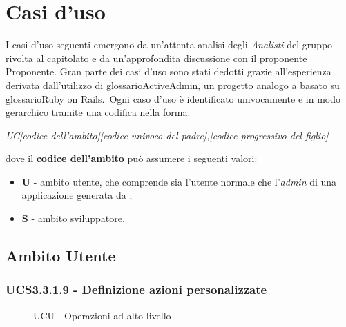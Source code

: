 \section{Casi d'uso}
I casi d'uso seguenti emergono da un'attenta analisi degli \textit{Analisti} del gruppo \GroupName{} rivolta al capitolato e da un'approfondita discussione con il proponente Proponente{}. Gran parte dei casi d'uso sono stati dedotti grazie all'esperienza derivata dall'utilizzo di glossario{ActiveAdmin}, un progetto analogo a \ProjectName{} basato su glossario{Ruby on Rails}.\
Ogni caso d'uso è identificato univocamente e in modo gerarchico tramite una codifica nella forma:

\begin{center}

\textit{UC[codice dell'ambito][codice univoco del padre],[codice progressivo del figlio]}

\end{center} 

dove il \textbf{codice dell'ambito} può assumere i seguenti valori:

\begin{itemize}

  \item \textbf{U} - ambito utente, che comprende sia l'utente normale che l'\textit{admin} di una applicazione generata da \ProjectName{};
  \item \textbf{S} - ambito sviluppatore.

\end{itemize}

\subsection{Ambito Utente}
\subsubsection{UCS3.3.1.9 - Definizione azioni personalizzate}
    
    \begin{figure}[H]
      \caption{UCU - Operazioni ad alto livello} 
    \end{figure}
      
